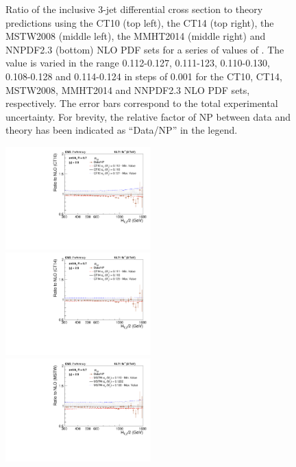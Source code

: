 \begin{figure}[!htbp]
\begin{center}
    \caption{Ratio of the inclusive 3-jet differential cross section to theory predictions using the CT10 (top left), the CT14 (top right),
      the MSTW2008 (middle left), the MMHT2014 (middle right) and NNPDF2.3 (bottom) NLO PDF sets for a 
      series of values of \alpsmz. The \alpsmz value is varied in the range 0.112-0.127, 0.111-123, 0.110-0.130, 0.108-0.128 and 0.114-0.124 in steps of 0.001 for the CT10, CT14, MSTW2008, MMHT2014 and NNPDF2.3 NLO PDF sets, respectively. The error bars correspond to the total experimental uncertainty. For brevity, the relative factor of NP 
      between data and theory has been indicated as ``Data/NP'' in
      the legend.}
    \label{fig:sensitivity_3}
  \end{center}
\end{figure}

\begin{figure}[!htbp]
  \begin{center}
    \includegraphics[width=0.5\textwidth]{Plots_HT_2_150/Sensitivity_Pdfs/Sensitivity_double_ratio_32_CT10.pdf}%
    \includegraphics[width=0.5\textwidth]{Plots_HT_2_150/Sensitivity_Pdfs/Sensitivity_double_ratio_32_CT14.pdf}\\
    \includegraphics[width=0.5\textwidth]{Plots_HT_2_150/Sensitivity_Pdfs/Sensitivity_double_ratio_32_MSTW2008.pdf}%

\end{center}
\end{figure}
